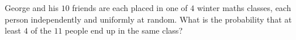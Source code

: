 George and his $10$ friends are each placed in one of $4$ winter maths classes, each person independently and uniformly at random. What is the probability that at least $4$ of the $11$ people end up in the same class?
